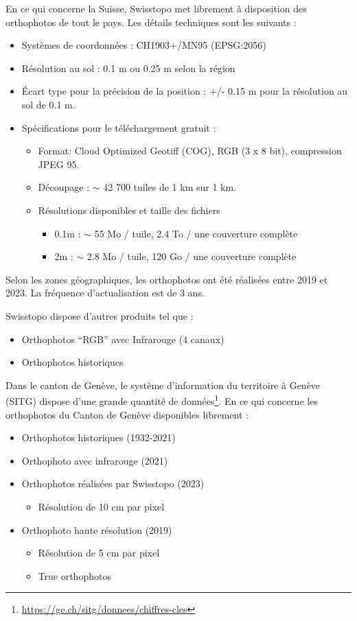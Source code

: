 En ce qui concerne la Suisse, Swisstopo \cite{swisstopo_swissimage_nodate} met librement à disposition des orthophotos de tout le pays. Les détails techniques sont les suivants :
\begin{itemize}
    \item Systèmes de coordonnées : CH1903+/MN95 (EPSG:2056)
    \item Résolution au sol : 0.1 m ou 0.25 m selon la région
    \item Écart type pour la précision de la position : +/- 0.15 m pour la résolution au sol de 0.1 m.
    \item Spécifications pour le téléchargement gratuit :
    \begin{itemize}
        \item Format: Cloud Optimized Geotiff (COG), RGB (3 x 8 bit), compression JPEG 95.
        \item Découpage : $\sim$ 42 700 tuiles de 1 km sur 1 km.
        \item Résolutions disponibles et taille des fichiers
        \begin{itemize}
            \item 0.1m : $\sim$ 55 Mo / tuile, 2.4 To / une couverture complète
            \item 2m : $\sim$ 2.8 Mo / tuile, 120 Go / une couverture complète
        \end{itemize}
    \end{itemize}
\end{itemize}

Selon les zones géographiques, les orthophotos ont été réalisées entre 2019 et 2023. La fréquence d'actualisation est de 3 ans.

Swisstopo dispose d'autres produits tel que :
\begin{itemize}
    \item Orthophotos ``RGB'' avec Infrarouge (4 canaux)
    \item Orthophotos historiques
\end{itemize}

Dans le canton de Genève, le système d'information du territoire à Genève (SITG) dispose d'une grande quantité de données\footnote{\url{https://ge.ch/sitg/donnees/chiffres-cles}}. En ce qui concerne les orthophotos du Canton de Genève disponibles librement :
\begin{itemize}
    \item Orthophotos historiques (1932-2021)
    \item Orthophoto avec infrarouge (2021)
    \item Orthophotos réalisées par Swisstopo (2023)
    \begin{itemize}
        \item Résolution de 10 cm par pixel
    \end{itemize}
    \item Orthophoto haute résolution (2019)
    \begin{itemize}
        \item Résolution de 5 cm par pixel
        \item True orthophotos
    \end{itemize}
\end{itemize}


